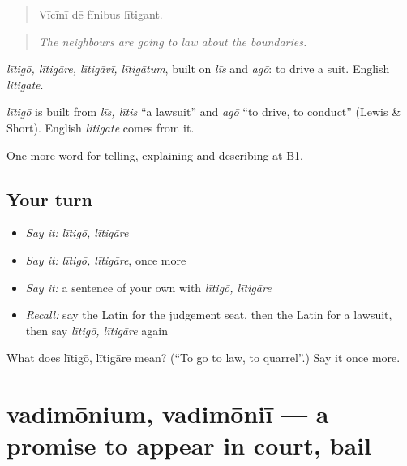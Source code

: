 \begin{quote}
Vīcīnī dē fīnibus lītigant.
\end{quote}

\begin{quote}
\emph{The neighbours are going to law about the boundaries.}
\end{quote}

\emph{lītigō, lītigāre, lītigāvī, lītigātum}, built on \emph{līs} and \emph{agō}: to drive a suit. English \emph{litigate}.

\begin{cousinweb}
\emph{lītigō} is built from \emph{līs, lītis} \textquotedblleft{}a lawsuit\textquotedblright{} and \emph{agō} \textquotedblleft{}to drive, to conduct\textquotedblright{} (Lewis \& Short). English \emph{litigate} comes from it.
\end{cousinweb}

\begin{grammarlens}[title={What you've built}]
One more word for telling, explaining and describing at B1.
\end{grammarlens}

\subsection*{Your turn}
\begin{itemize}
\raggedright
  \item \emph{Say it:} \emph{lītigō, lītigāre}
  \item \emph{Say it:} \emph{lītigō, lītigāre}, once more
  \item \emph{Say it:} a sentence of your own with \emph{lītigō, lītigāre}
  \item \emph{Recall:} say the Latin for the judgement seat, then the Latin for a lawsuit, then say \emph{lītigō, lītigāre} again
\end{itemize}

\begin{tcolorbox}[breakable,colback=teal!4,colframe=teal!35!black,title={Before you move on}]
What does lītigō, lītigāre mean? (\textquotedblleft{}To go to law, to quarrel\textquotedblright{}.) Say it once more.
\end{tcolorbox}
\section[vadimōnium, vadimōniī]{vadimōnium, vadimōniī — a promise to appear in court, bail}

\label{lesson:LA-C411-vadimonium}



